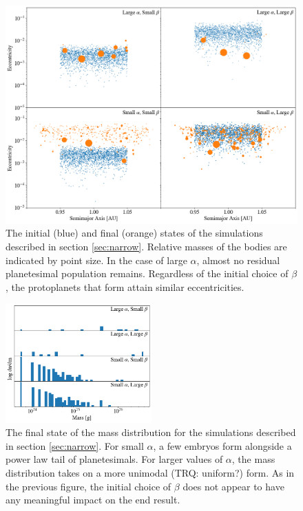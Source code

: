 \documentclass[twocolumn]{aastex63}
\begin{document}
\begin{figure}
\begin{center}
    \includegraphics[width=\textwidth]{figures/alpha_beta.png}
    \caption{The initial (blue) and final (orange) states of the simulations described in section \ref{sec:narrow}. Relative masses of the bodies are indicated by point size. In the case of large $\alpha$, almost no residual planetesimal population remains. Regardless of the initial choice of $\beta$, the protoplanets that form attain similar eccentricities. \label{fig:alpha_beta}}
\end{center}
\end{figure}

\begin{figure}
\begin{center}
    \includegraphics[width=0.5\textwidth]{figures/alpha_beta_mass.png}
    \caption{The final state of the mass distribution for the
      simulations described in section \ref{sec:narrow}. For small
      $\alpha$, a few embryos form alongside a power law tail of
      planetesimals. For larger values of $\alpha$, the mass
      distribution takes on a more unimodal (TRQ: uniform?) form. As in the previous figure, the initial choice of $\beta$ does not appear to have any meaningful impact on the end result.\label{fig:alpha_beta_mass}}
\end{center}
\end{figure}
\end{document}
